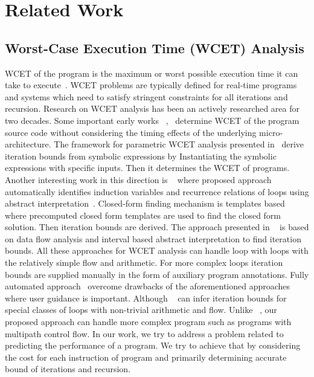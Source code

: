 \section{Related Work}
\label{sec:related}

\subsection{Worst-Case Execution Time (WCET) Analysis} 
WCET of the program is the maximum or worst possible execution time it can take to execute~\cite{Wilhelm:2008:WEP:1347375.1347389}. WCET problems are typically defined for real-time programs and systems which need to satisfy stringent constraints for all iterations and recursion.
Research on WCET analysis has been an actively researched area for two decades. 
Some important early works ~\cite{Puschner:1989:CME:84842.84850},~\cite{Zhang1993} determine WCET of the program source code without considering the timing effects of the underlying micro-architecture. 
The framework for parametric WCET analysis presented in~\cite{DBLP:conf/wcet/Lisper03} derive iteration bounds from symbolic expressions by Instantiating the symbolic expressions with specific inputs. 
Then it determines the WCET of programs. Another interesting work in this direction is ~\cite{4617284} where proposed approach automatically identifies induction variables and recurrence relations of loops using abstract interpretation~\cite{Ammarguellat:1990:ARI:93542.93583}. Closed-form finding mechanism is templates based where precomputed closed form templates are used to find the closed form solution. Then iteration bounds are derived. The approach presented in ~\cite{Prantltubound} is based on data flow analysis and interval based abstract interpretation to find iteration bounds. 
All these approaches for WCET analysis can handle loop with loops with the relatively simple flow and arithmetic.
For more complex loops iteration bounds are supplied manually in the form of auxiliary program annotations. Fully automated approach~\cite{Knoop:2011:SLB:2341512.2341532} overcome drawbacks of the aforementioned approaches where user guidance is important. Although ~\cite{Knoop:2011:SLB:2341512.2341532} can infer iteration bounds for special classes of loops with non-trivial arithmetic and flow. Unlike ~\cite{Knoop:2011:SLB:2341512.2341532}, our proposed approach can handle more complex program such as programs with multipath control flow. 
In our work, we try to address a problem related to predicting the performance of a program. 
We try to achieve that by considering the cost for each instruction of program and primarily determining accurate bound of iterations and recursion.

